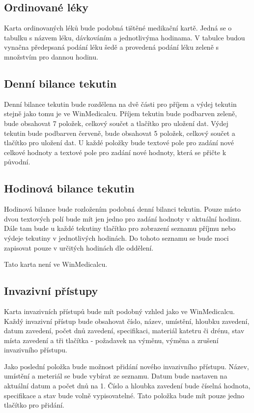 \subsection{Ordinované léky}

Karta ordinovaných léků bude podobná tištěné medikační kartě. Jedná se o tabulku s názvem léku, dávkováním a jednotlivýma hodinama. V tabulce budou vynačna předepsaná podání léku šedě a provedená podání léku zeleně s množstvím pro dannou hodinu.

\subsection{Denní bilance tekutin}

Denní bilance tekutin bude rozdělena na dvě části pro příjem a výdej tekutin stejně jako tomu je ve WinMedicalcu. Příjem tekutin bude podbarven zeleně, bude obsahovat 7 položek, celkový součet a tlačítko pro uložení dat. Výdej tekutin bude podbarven červeně, bude obsahovat 5 položek, celkový součet a tlačítko pro uložení dat. U každé položky bude textové pole pro zadání nové celkové hodnoty a textové pole pro zadání nové hodnoty, která se přičte k původní.

\subsection{Hodinová bilance tekutin}

Hodinová bilance bude rozložením podobná denní bilanci tekutin. Pouze místo dvou textových polí bude mít jen jedno pro zadání hodnoty v aktuální hodinu. Dále tam bude u každé tekutiny tlačítko pro zobrazení seznamu příjmu nebo výdeje tekutiny v jednotlivých hodinách. Do tohoto seznamu se bude moci zapisovat pouze v určitých hodinách dle oddělení.

Tato karta není ve WinMedicalcu.

\subsection{Invazivní přístupy}

Karta invazivních přístupů bude mít podobný vzhled jako ve WinMedicalcu. Každý invazivní přístup bude obsahovat číslo, název, umístění, hloubku zavedení, datum zavedení, počet dnů zavedení, specifikaci, materiál katetru či drénu, stav místa zavedení a tři tlačítka - požadavek na výměnu, výměna a zrušení invazivního přístupu.

Jako poslední položka bude možnost přidání nového invazivního přístupu. Název, umístění a meteriál se bude vybírat ze seznamu. Datum bude nastaven na aktuální datum a počet dnů na 1. Číslo a hloubka zavedení bude číselná hodnota, specifikace a stav bude volně vypisovatelné. Tato položka bude mít pouze jedno tlačítko pro přidání.

